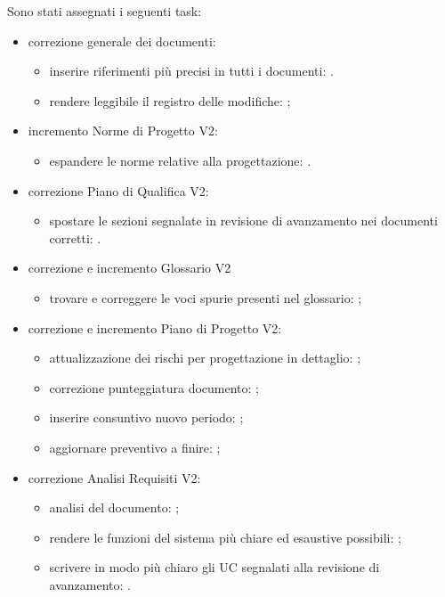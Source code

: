 Sono stati assegnati i seguenti task:
\begin{itemize}
	\item correzione generale dei documenti:
	\begin{itemize}
		\item inserire riferimenti più precisi in tutti i documenti: \Isacco{}.
		\item rendere leggibile il registro delle modifiche: \Carlo{};
	\end{itemize}
	\item incremento Norme di Progetto V2:
	\begin{itemize}
		\item espandere le norme relative alla progettazione: \Carlo{}.
	\end{itemize}
	\item correzione Piano di Qualifica V2:
	\begin{itemize}
		\item spostare le sezioni segnalate in revisione di avanzamento nei documenti corretti: \Leonardo{}.
	\end{itemize}
	\item correzione e incremento Glossario V2
	\begin{itemize}
		\item trovare e correggere le voci spurie presenti nel glossario: \Isacco{};
	\end{itemize}
	\item correzione e incremento Piano di Progetto V2:
	\begin{itemize}
		\item attualizzazione dei rischi per progettazione in dettaglio: \Mattia{};
		\item correzione punteggiatura documento: \Mattia{};
		\item inserire consuntivo nuovo periodo: \Mattia{};
		\item aggiornare preventivo a finire: \Mattia{};
	\end{itemize}
	\item correzione Analisi Requisiti V2:
	\begin{itemize}
		\item analisi del documento: \Cristian{};
		\item rendere le funzioni del sistema più chiare ed esaustive possibili: \Cristian{};
		\item scrivere in modo più chiaro gli UC segnalati alla revisione di avanzamento: \Tommaso{}.
	\end{itemize}
\end{itemize}

